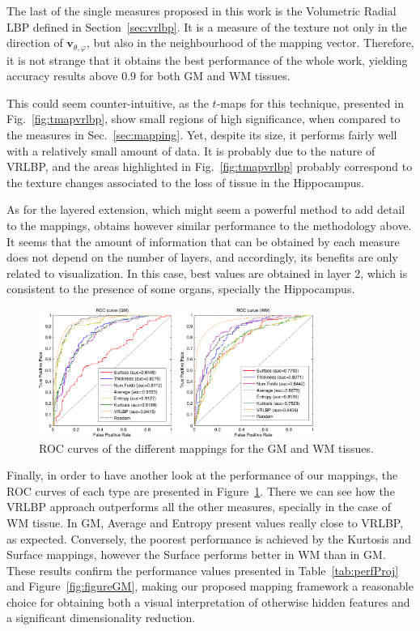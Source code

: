 The last of the single measures proposed in this work is the Volumetric Radial LBP defined in Section~\ref{sec:vrlbp}. It is a measure of the texture not only in the direction of $\mathbf{v}_{\theta,\varphi}$, but also in the neighbourhood of the mapping vector. Therefore, it is not strange that it obtains the best performance of the whole work, yielding accuracy results above $0.9$ for both \ac{GM} and \ac{WM} tissues. 

This could seem counter-intuitive, as the $t$-maps for this technique, presented in Fig.~\ref{fig:tmapvrlbp}, show small regions of high significance, when compared to the measures in Sec.~\ref{sec:mapping}. Yet, despite its size, it performs fairly well with a relatively small amount of data. It is probably due to the nature of VRLBP, and the areas highlighted in Fig.~\ref{fig:tmapvrlbp} probably correspond to the texture changes associated to the loss of tissue in the Hippocampus. 

As for the layered extension, which might seem a powerful method to add detail to the mappings, obtains however similar performance to the methodology above. It seems that the amount of information that can be obtained by each measure does not depend on the number of layers, and accordingly, its benefits are only related to visualization. In this case, best values are obtained in layer 2, which is consistent to the presence of some organs, specially the Hippocampus.  

\begin{figure}[htp]%
	\centering
	\includegraphics[width=0.8\textwidth]{Graphics/ch6/13-ROC}
	
	\caption{ROC curves of the different mappings for the \ac{GM} and \ac{WM} tissues.}
	\label{fig:roc}
\end{figure}

Finally, in order to have another look at the performance of our mappings, the ROC curves of each type are presented in Figure~\ref{fig:roc}. There we can see how the VRLBP approach outperforms all the other measures, specially in the case of \ac{WM} tissue. In \ac{GM}, Average and Entropy present values really close to VRLBP, as expected. Conversely, the poorest performance is achieved by the Kurtosis and Surface mappings, however the Surface performs better in \ac{WM} than in \ac{GM}. These results confirm the performance values presented in  Table~\ref{tab:perfProj} and Figure~\ref{fig:figureGM}, making our proposed mapping framework a reasonable choice for obtaining both a visual interpretation of otherwise hidden features and a significant dimensionality reduction. 

